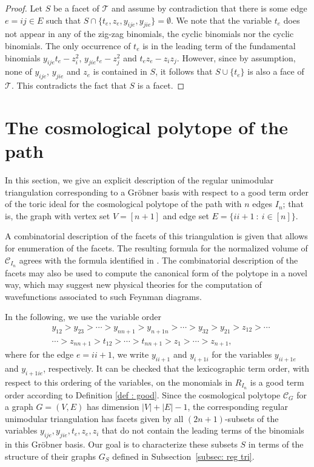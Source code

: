 \documentclass[11pt]{article}
\theoremstyle{definition}
\numberwithin{equation}{section}
\begin{document}
\begin{proof}
    Let $S$ be a facet of $\mathcal{T}$ and assume by contradiction that there is some edge $e=ij\in E$ such that $S\cap\{t_e,z_e,y_{ije},y_{jie}\}=\emptyset$. We note that the variable $t_e$ does not appear in any of the zig-zag binomials, the cyclic binomials nor the cyclic binomials. The only occurrence of $t_e$ is in the leading term of the fundamental binomials $y_{ije}t_e-z_i^2$, $y_{jie}t_e-z_j^2$ and $t_ez_e-z_iz_j$. However, since by assumption, none of $y_{ije}$, $y_{jie}$ and $z_e$ is contained in $S$, it follows that $S\cup\{t_e\}$ is also a face of $\mathcal{T}$. This contradicts the fact that $S$ is a facet.
\end{proof}



\section{The cosmological polytope of the path}
\label{sec: the path}
In this section, we give an explicit description of the regular unimodular triangulation corresponding to a Gr\"obner basis with respect to a good term order of the toric ideal for the cosmological polytope of the path with $n$ edges $I_n$; that is, the graph with vertex set $V =[n+1]$ and edge set
$
E = \{ii+1~ :~ i\in[n]\}.
$

A combinatorial description of the facets of this triangulation is given that allows for enumeration of the facets.
The resulting formula for the normalized volume of $\mathcal{C}_{I_n}$ agrees with the formula identified in \cite{kuhne2022faces}.
The combinatorial description of the facets may also be used to compute the canonical form of the polytope in a novel way, which may suggest new physical theories for the computation of wavefunctions associated to such Feynman diagrams.

In the following, we use the variable order
\begin{equation}
\begin{split}
\label{eqn: path variable order}
&y_{12} > y_{23} > \cdots > y_{nn+1} > y_{n+1n} > \cdots > y_{32} > y_{21} > z_{12} > \cdots\\
&\cdots> z_{nn+1} > t_{12} > \cdots > t_{nn+1} > z_1 > \cdots > z_{n+1},
\end{split}
\end{equation}
where for the edge $e=ii+1$, we write $y_{ii+1}$ and $y_{i+1i}$ for the variables $y_{ii+1e}$ and $y_{i+1ie}$, respectively. 
It can be checked that the lexicographic term order, with respect to this ordering of the variables, on the monomials in $R_{I_n}$ is a good term order according to Definition \ref{def : good}.  
Since the cosmological polytope $\mathcal{C}_{G}$ for a graph $G = (V, E)$ has dimension $|V| + |E| -1$, the corresponding regular unimodular triangulation has facets given by all $(2n+1)$-subsets of the variables $y_{ije}, y_{jie}, t_e, z_e, z_i$ that do not contain the leading terms of the binomials in this Gr\"obner basis. Our goal is to characterize these subsets $S$ in terms of the structure of their graphs $G_S$ defined in Subsection~\ref{subsec: reg tri}.
\end{document}
